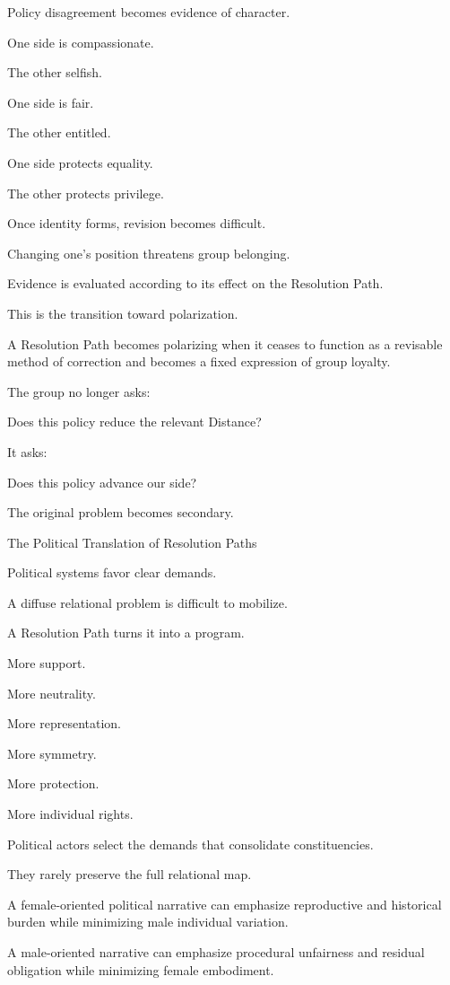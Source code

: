 Policy disagreement becomes evidence of character.

One side is compassionate.

The other selfish.

One side is fair.

The other entitled.

One side protects equality.

The other protects privilege.

Once identity forms, revision becomes difficult.

Changing one’s position threatens group belonging.

Evidence is evaluated according to its effect on the Resolution Path.

This is the transition toward polarization.

A Resolution Path becomes polarizing when it ceases to function as a revisable method of correction and becomes a fixed expression of group loyalty.

The group no longer asks:

Does this policy reduce the relevant Distance?

It asks:

Does this policy advance our side?

The original problem becomes secondary.

The Political Translation of Resolution Paths

Political systems favor clear demands.

A diffuse relational problem is difficult to mobilize.

A Resolution Path turns it into a program.

More support.

More neutrality.

More representation.

More symmetry.

More protection.

More individual rights.

Political actors select the demands that consolidate constituencies.

They rarely preserve the full relational map.

A female-oriented political narrative can emphasize reproductive and historical burden while minimizing male individual variation.

A male-oriented narrative can emphasize procedural unfairness and residual obligation while minimizing female embodiment.

